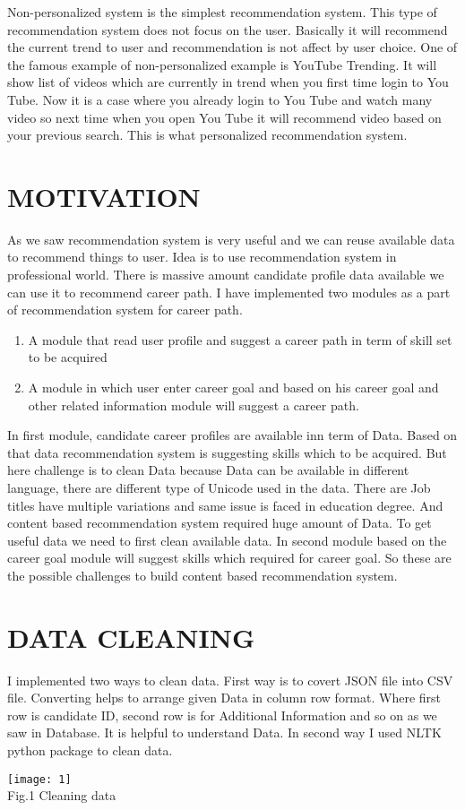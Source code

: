 \documentclass[journal, a4paper]{IEEEtran}
\begin{document}
	Non-personalized system is the simplest recommendation system. This type of recommendation system does not focus on the user. Basically it will recommend the current trend to user and recommendation is not affect by user choice. One of the famous example of non-personalized example is YouTube Trending. It will show list of videos which are currently in trend when you first time login to You Tube. Now it is a case where you already login to You Tube and watch many video so next time when you open You Tube it will recommend video based on your previous search. This is what personalized recommendation system.  	
\section{MOTIVATION}
	As we saw recommendation system is very useful and we can reuse available data to recommend things to user. Idea is to use recommendation system in professional world. There is massive amount candidate profile data available we can use it to recommend career path. I have implemented two modules as a part of recommendation system for career path.
	\begin{enumerate}
		\item A module that read user profile and suggest a career path in term of skill set to be acquired
		\item A module in which user enter career goal and based on his career goal and other related information module will suggest a career path.
		
	\end{enumerate}
	
	In first module, candidate career profiles are available inn term of Data. Based on that data recommendation system is suggesting skills which to be acquired. But here challenge is to clean Data because Data can be available in different language, there are different type of Unicode used in the data. There are Job titles have multiple variations and same issue is faced in education degree. And content based recommendation system required huge amount of Data. To get useful data we need to first clean available data. In second module based on the career goal module will suggest skills which required for career goal. So these are the possible challenges to build content based recommendation system.   


\section{DATA CLEANING }
I implemented two ways to clean data. First way is to covert JSON file into CSV file. Converting helps to arrange given Data in column row format. Where first row is candidate ID, second row is for Additional Information and so on as we saw in Database. It is helpful to understand Data. In second way I used NLTK python package to clean data.
\begin{center}
	\texttt{[image: 1]}\\
\small	Fig.1 Cleaning data
\end{center}
\end{document}
